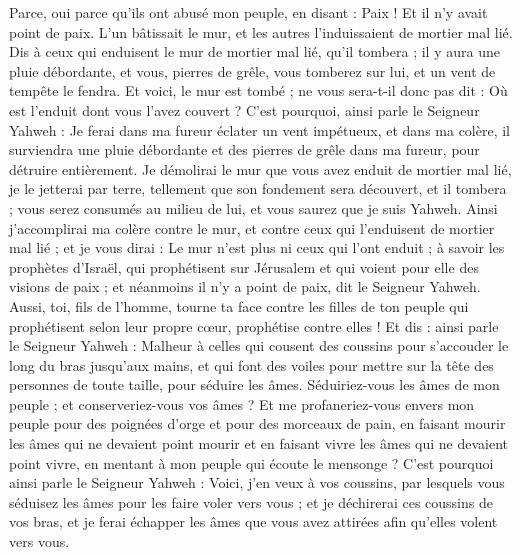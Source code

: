 \begin{multicols}{2}
Parce, oui parce qu'ils ont abusé mon peuple, en disant : Paix ! Et il n'y avait point de paix. L'un bâtissait le mur, et les autres l'induissaient de mortier mal lié.
Dis à ceux qui enduisent le mur de mortier mal lié, qu'il tombera ; il y aura une pluie débordante, et vous, pierres de grêle, vous tomberez sur lui, et un vent de tempête le fendra.
Et voici, le mur est tombé ; ne vous sera-t-il donc pas dit : Où est l'enduit dont vous l'avez couvert ?
C'est pourquoi, ainsi parle le Seigneur Yahweh : Je ferai dans ma fureur éclater un vent impétueux, et dans ma colère, il surviendra une pluie débordante et des pierres de grêle dans ma fureur, pour détruire entièrement.
Je démolirai le mur que vous avez enduit de mortier mal lié, je le jetterai par terre, tellement que son fondement sera découvert, et il tombera ; vous serez consumés au milieu de lui, et vous saurez que je suis Yahweh.
Ainsi j'accomplirai ma colère contre le mur, et contre ceux qui l'enduisent de mortier mal lié ; et je vous dirai : Le mur n'est plus ni ceux qui l'ont enduit ;
à savoir les prophètes d'Israël, qui prophétisent sur Jérusalem et qui voient pour elle des visions de paix ; et néanmoins il n'y a point de paix, dit le Seigneur Yahweh.
Aussi, toi, fils de l'homme, tourne ta face contre les filles de ton peuple qui prophétisent selon leur propre cœur, prophétise contre elles !
 Et dis : ainsi parle le Seigneur Yahweh : Malheur à celles qui cousent des coussins pour s'accouder le long du bras jusqu'aux mains, et qui font des voiles pour mettre sur la tête des personnes de toute taille, pour séduire les âmes. Séduiriez-vous les âmes de mon peuple ; et conserveriez-vous vos âmes ?
Et me profaneriez-vous envers mon peuple pour des poignées d'orge et pour des morceaux de pain, en faisant mourir les âmes qui ne devaient point mourir et en faisant vivre les âmes qui ne devaient point vivre, en mentant à mon peuple qui écoute le mensonge ?
C'est pourquoi ainsi parle le Seigneur Yahweh : Voici, j'en veux à vos coussins, par lesquels vous séduisez les âmes pour les faire voler vers vous ; et je déchirerai ces coussins de vos bras, et je ferai échapper les âmes que vous avez attirées afin qu'elles volent vers vous.

\end{multicols}
